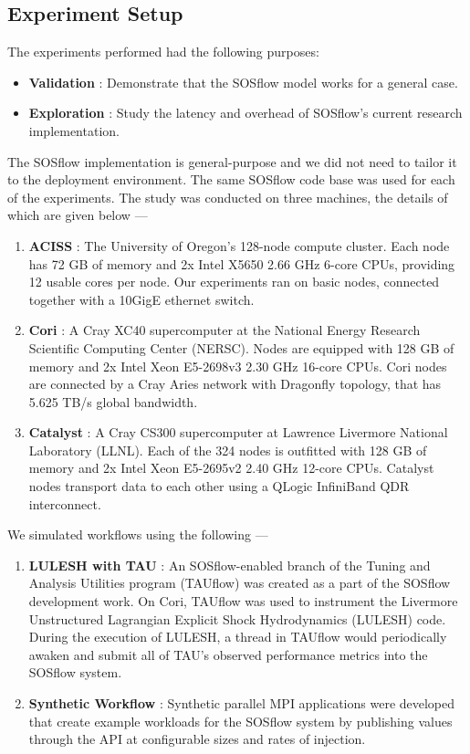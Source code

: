 \subsection{Experiment Setup} %
%
The experiments performed had the following purposes:
%
\begin{itemize}
\item \textbf{Validation} : Demonstrate that the SOSflow model works
  for a general case.
%
\item \textbf{Exploration} : Study the latency and overhead of
  SOSflow's current research implementation.
%
\end {itemize}
%
The SOSflow implementation is general-purpose and we did not need to
tailor it to the deployment environment.
%
The same SOSflow code base was used for each of the experiments.
%
The study was conducted on three machines, the details of which are
given below ---
%
\begin{enumerate}
%
\item \textbf{ACISS} : The University of Oregon's 128-node compute
  cluster.
%
Each node has 72 GB of memory and 2x Intel X5650 2.66 GHz 6-core CPUs,
providing 12 usable cores per node.
%
Our experiments ran on basic nodes, connected together with a 10GigE
ethernet switch.
%
%
\item \textbf{Cori} : A Cray XC40 supercomputer at the National Energy Research Scientific
  Computing Center (NERSC).
%
Nodes are equipped with 128 GB of memory and 2x Intel Xeon
E5-2698v3 2.30 GHz 16-core CPUs.
%
Cori nodes are connected by a Cray Aries network with Dragonfly
topology, that has 5.625 TB/s global bandwidth.
%
%
\item \textbf{Catalyst} : A Cray CS300 supercomputer at Lawrence
  Livermore National Laboratory (LLNL).
%
Each of the 324 nodes is outfitted with 128 GB of memory and 2x Intel
Xeon E5-2695v2 2.40 GHz 12-core CPUs.
%
Catalyst nodes transport data to each other using a QLogic InfiniBand
QDR interconnect.
%
\end{enumerate}
%
%
We simulated workflows using the following --- 
%
\begin{enumerate}
%
\item \textbf{LULESH with TAU} : An SOSflow-enabled branch of the
  Tuning and Analysis Utilities program (TAUflow) was created as a
  part of the SOSflow development work.
%
On Cori, TAUflow was used to instrument the Livermore Unstructured
Lagrangian Explicit Shock Hydrodynamics (LULESH) code.
%
During the execution of LULESH, a thread in TAUflow would periodically
awaken and submit all of TAU's observed performance metrics into the
SOSflow system.
%
\item \textbf{Synthetic Workflow} : Synthetic parallel MPI
  applications were developed that create example workloads for the
  SOSflow system by publishing values through the API at configurable
  sizes and rates of injection.
%
\end{enumerate}
%
%


